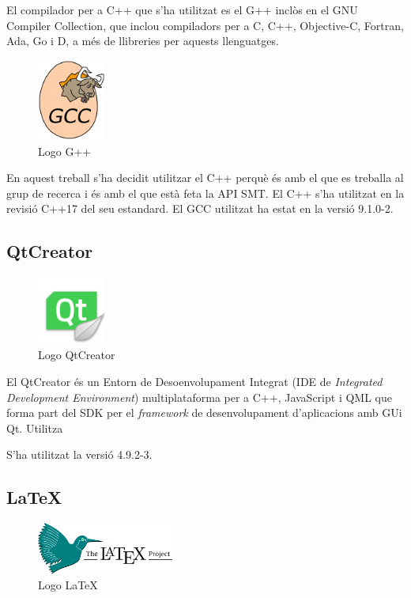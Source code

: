 \documentclass[11pt,a4paper,twoside]{report}
\begin{document}
  El compilador per a C++ que s'ha utilitzat es el G++ inclòs en el GNU Compiler Collection, que inclou compiladors per a C, C++, Objective-C, Fortran, Ada, Go i D, a més de llibreries per aquests llenguatges. 
  

  \begin{figure}[ht!]
    \centering
    \includegraphics[width=0.2\textwidth]{Diagrames/gcc.png}
    \caption{Logo G++}
    \label{fig:gpp}
  \end{figure}


  En aquest treball s'ha decidit utilitzar el C++ perquè és amb el que es treballa al grup de recerca i és amb el que està feta la API SMT. El C++ s'ha utilitzat en la revisió C++17 del seu estandard. El GCC utilitzat ha estat en la versió 9.1.0-2. 

  \subsection{QtCreator}

  \begin{figure}[ht!]
    \centering
    \includegraphics[width=0.2\textwidth]{Diagrames/qtc.png}
    \caption{Logo QtCreator}
    \label{fig:qtc}
  \end{figure}

  El QtCreator és un Entorn de Desoenvolupament Integrat (IDE de \textit{Integrated Development Environment}) multiplataforma per a C++, 
  JavaScript i QML que forma part del SDK per el \textit{framework} de desenvolupament d'aplicacions amb GUi Qt. Utilitza 

  S'ha utilitzat la versió 4.9.2-3.

  \subsection{\LaTeX}
  \begin{figure}[ht!]
    \centering
    \includegraphics[width=0.4\textwidth]{Diagrames/latex.png}
    \caption{Logo \LaTeX}
    \label{fig:latex}
  \end{figure}
  
\end{document}
